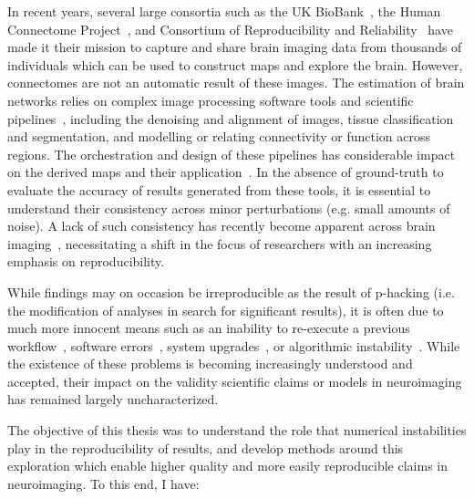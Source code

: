 In recent years, several large consortia such as the UK BioBank~\cite{sudlow2015uk}, the Human Connectome
Project~\cite{van2013wu}, and Consortium of Reproducibility and Reliability~\cite{zuo2014open} have made it their
mission to capture and share brain imaging data from thousands of individuals which can be used to construct maps and
explore the brain. However, connectomes are not an automatic result of these images. The estimation of brain networks
relies on complex image processing software tools and scientific
pipelines~\cite{hagmann2005diffusion,esteban2019fmriprep}, including the denoising and alignment of images, tissue
classification and segmentation, and modelling or relating connectivity or function across regions. The orchestration
and design of these pipelines has considerable impact on the derived maps and their
application~\cite{bowring2019exploring,klein2009evaluation}. In the absence of ground-truth to evaluate the accuracy of
results generated from these tools, it is essential to understand their consistency across minor perturbations (e.g.
small amounts of noise). A lack of such consistency has recently become apparent across brain
imaging~\cite{glatard2015reproducibility,Lewis2017-ll,eklund2016cluster}, necessitating a shift in the focus of
researchers with an increasing emphasis on reproducibility.

While findings may on occasion be irreproducible as the result of p-hacking (i.e. the modification of analyses in
search for significant results), it is often due to much more innocent means such as an inability to re-execute a
previous workflow~\cite{collberg2016repeatability}, software errors~\cite{eklund2016cluster}, system
upgrades~\cite{salari2020file}, or algorithmic instability~\cite{Lewis2017-ll}. While the existence of these problems
is becoming increasingly understood and accepted, their impact on the validity scientific claims or models in
neuroimaging has remained largely uncharacterized.

The objective of this thesis was to understand the role that numerical instabilities play in the reproducibility of
results, and develop methods around this exploration which enable higher quality and more easily reproducible claims
in neuroimaging. To this end, I have:

